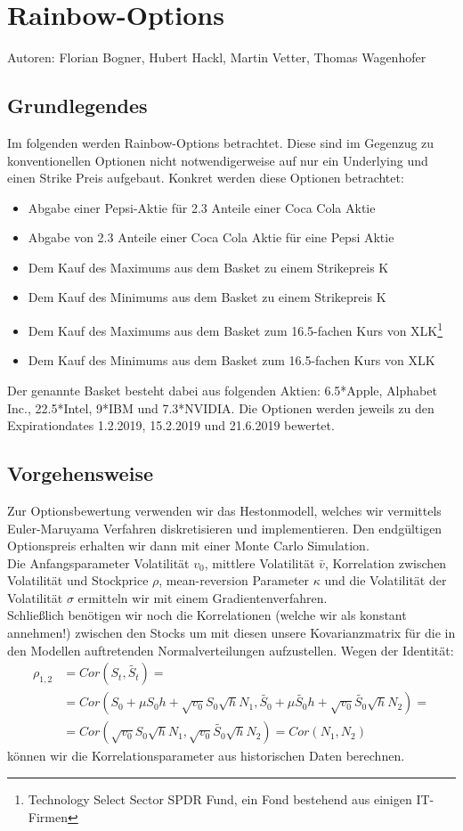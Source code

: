 \documentclass[a4paper,12pt]{article}
\numberwithin[\arabic]{Satz}{section}
\begin{document}
	\section*{Rainbow-Options}
	Autoren: Florian Bogner, Hubert Hackl, Martin Vetter, Thomas Wagenhofer
		\subsection*{Grundlegendes}
			Im folgenden werden Rainbow-Options betrachtet. Diese sind im Gegenzug zu konventionellen Optionen nicht notwendigerweise auf nur ein Underlying und einen Strike Preis aufgebaut.
			\newline
			Konkret werden diese Optionen betrachtet:
			\begin{itemize}
				\item Abgabe einer Pepsi-Aktie für 2.3 Anteile einer Coca Cola Aktie
				\item Abgabe von 2.3 Anteile einer Coca Cola Aktie für eine Pepsi Aktie
				\item Dem Kauf des Maximums aus dem Basket zu einem Strikepreis K
				\item Dem Kauf des Minimums aus dem Basket zu einem Strikepreis K
				\item Dem Kauf des Maximums aus dem Basket zum 16.5-fachen Kurs von XLK\footnote{Technology Select Sector SPDR Fund, ein Fond bestehend aus einigen IT-Firmen}
				\item Dem Kauf des Minimums aus dem Basket zum 16.5-fachen Kurs von XLK
			\end{itemize}
			Der genannte Basket besteht dabei aus folgenden Aktien: 6.5*Apple, Alphabet Inc., 22.5*Intel, 9*IBM und 7.3*NVIDIA.
			Die Optionen werden jeweils zu den Expirationdates 1.2.2019, 15.2.2019 und 21.6.2019 bewertet.
		\subsection*{Vorgehensweise}
		Zur Optionsbewertung verwenden wir das Hestonmodell, welches wir vermittels Euler-Maruyama Verfahren diskretisieren und implementieren. Den endgültigen Optionspreis erhalten wir dann mit einer Monte Carlo Simulation.\\
		Die Anfangsparameter Volatilität $v_0$, mittlere Volatilität $\bar{v}$, Korrelation zwischen Volatilität und Stockprice $\rho$, mean-reversion Parameter $\kappa$ und die Volatilität der Volatilität $\sigma$ ermitteln wir mit einem Gradientenverfahren.\\
		Schließlich benötigen wir noch die Korrelationen (welche wir als konstant annehmen!) zwischen den Stocks um mit diesen unsere Kovarianzmatrix für die in den Modellen auftretenden Normalverteilungen aufzustellen.
		Wegen der Identität:
		\begin{align*}
			\rho_{1,2}&=Cor(S_t,\tilde{S_t})=\\
			&=Cor(S_0+\mu S_0h+\sqrt{v_0}S_0\sqrt{h}N_1,\tilde{S_0}+\mu \tilde{S_0}h+\sqrt{v_0}\tilde{S_0}\sqrt{h}N_2)= \\
			&=Cor(\sqrt{v_0}S_0\sqrt{h}N_1,\sqrt{v_0}\tilde{S_0}\sqrt{h}N_2)=Cor(N_1,N_2)
		\end{align*}
		können wir die Korrelationsparameter aus historischen Daten berechnen.
		\newpage
\end{document}

